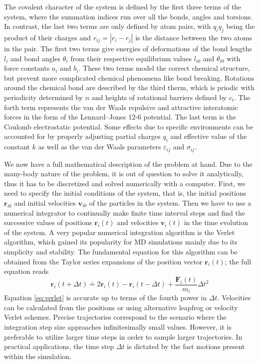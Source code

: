 The covalent character of the system is defined by the first three terms of
the system, where the summation indices run over all the bonds, angles and
torsions. In contrast, the last two terms are only defined by atom pairs,
with $q_i q_j$ being the product of their charges and $r_{ij} = |r_i - r_j|$
is the distance between the two atoms in the pair. The first two terms give
energies of deformations of the bond lengths $l_i$ and bond angles $\theta_i$
from their respective equilibrium values $l_{i0}$ and $\theta_{i0}$ with force
constants $a_i$ and $b_i$. These two terms model the correct chemical
structure, but prevent more complicated chemical phenomena like bond breaking.
Rotations around the chemical bond are described by the third therm, which is
priodic with periodicity determined by $n$ and heights of rotational barriers
defined by $c_i$. The forth term represents the van der Waals repulsive and
attractive interatomic forces in the form of the Lennard–Jones 12-6 potential.
The last term is the Coulomb electrostatic potential. Some effects due to
specific environments can be accounted for by properly adjusting partial
charges $q_i$ and effective value of the constant $k$ as well as the van der
Waals parameters $\varepsilon_{ij}$ and $\sigma_{ij}$.

We now have a full mathematical description of the problem at hand. Due to the
many-body nature of the problem, it is out of question to solve it
analytically, thus it has to be discretized and solved numerically with a
computer. First, we need to specify the initial conditions of the system,
that is, the initial positions $\mathbf{r}_{i0}$ and initial velocities
$\mathbf{v}_{i0}$ of the particles in the system. Then we have to use a
numerical integrator to continually make finite time interval steps and find
the successive values of positions $\mathbf{r}_i(t)$ and velocities
$\mathbf{v}_{i}(t)$ in the time evolution of the system. A very popular
numerical integration algorithm is the Verlet algorithm, which gained its
popularity for MD simulations mainly due to its simplicity and stability.
The fundamental equation for this algorithm can be obtained from the Taylor
series expansions of the position vector $\mathbf{r}_i(t)$; the full equation
reads
\begin{equation}
  \mathbf{r}_i (t + \Delta t) \doteq 2 \mathbf{r}_i(t)
    - \mathbf{r}_i(t - \Delta t) + \frac{\mathbf{F}_i(t)}{m_i} \Delta t^2
  \label{eq:verlet}
\end{equation}
Equation \eqref{eq:verlet} is accurate up to terms of the fourth power in
$\Delta t$. Velocities can be calculated from the positions or using
alternative leapfrog or velocity Verlet schemes. Precise trajectories
correspond to the scenario where the integration step size approaches
infinitesimally small values. However, it is preferable to utilize larger time
steps in order to sample larger trajectories. In practical applications, the
time step $\Delta t$ is dictated by the fast motions present within the
simulation.

